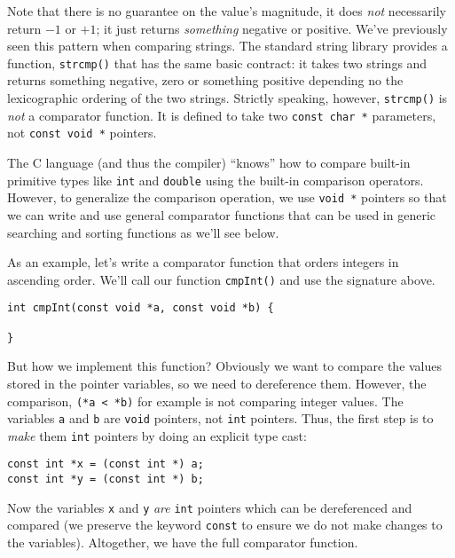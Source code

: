 Note that there is no guarantee on the value's magnitude, it does \emph{not}
necessarily return $-1$ or $+1$; it just returns \emph{something} negative or
positive.  We've previously seen this pattern when comparing strings.  The
standard string library provides a function, \texttt{strcmp()} that
has the same basic contract: it takes two strings and returns something
negative, zero or something positive depending no the lexicographic ordering
of the two strings.  Strictly speaking, however, \texttt{strcmp()} is
\emph{not} a comparator function.  It is defined to take two 
\texttt{const char *} parameters, not \texttt{const void *}
pointers.

The C language (and thus the compiler) ``knows'' how to compare built-in
primitive types like \texttt{int} and \texttt{double} using the
built-in comparison operators.  However, to generalize the comparison operation, 
we use \texttt{void *} pointers so that we can write and use general
comparator functions that can be used in generic searching and sorting functions
as we'll see below.

As an example, let's write a comparator function that orders integers in
ascending order.  We'll call our function \texttt{cmpInt()} and use
the signature above.

\begin{verbatim}
int cmpInt(const void *a, const void *b) {

}
\end{verbatim}

But how we implement this function?  Obviously we want to compare the values
stored in the pointer variables, so we need to dereference them.  However, 
the comparison, \texttt{(*a < *b)} for example is not comparing integer
values.  The variables \texttt{a} and \texttt{b} are 
\texttt{void} pointers, not \texttt{int} pointers.  Thus, the 
first step is to \emph{make} them \texttt{int} pointers by doing an
explicit type cast:

\begin{verbatim}
const int *x = (const int *) a;
const int *y = (const int *) b;
\end{verbatim}

Now the variables \texttt{x} and \texttt{y} \emph{are} 
\texttt{int} pointers which can be dereferenced and compared (we 
preserve the keyword \texttt{const} to ensure we do not make changes
to the variables).  Altogether, we have the full comparator function.

